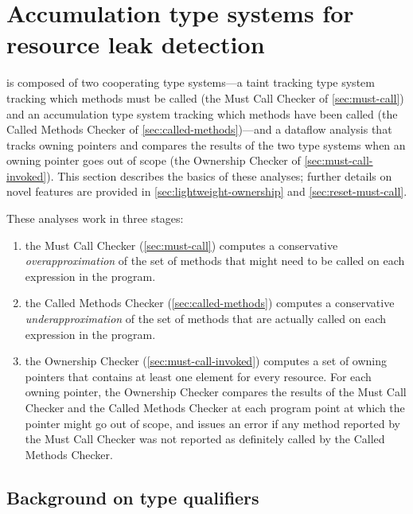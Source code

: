 
\section{Accumulation type systems for resource leak detection}
\label{sec:base-type-systems}

\tool is composed of two cooperating type systems---a taint tracking
type system tracking which methods must be called (the Must Call
Checker of \cref{sec:must-call}) and an accumulation type system
tracking which methods have been called (the Called Methods Checker of
\cref{sec:called-methods})---and a dataflow analysis that tracks
owning pointers and compares the results of the two type systems when
an owning pointer goes out of scope (the Ownership Checker of
\cref{sec:must-call-invoked}). This section describes the basics of
these analyses; further details on novel features are provided in
\cref{sec:lightweight-ownership} and \cref{sec:reset-must-call}.

These analyses work in three stages:
\begin{enumerate}
\item the Must Call Checker (\cref{sec:must-call}) computes a conservative
  \emph{overapproximation} of the set of methods that might need to be called
  on each expression in the program.
\item the Called Methods Checker (\cref{sec:called-methods}) computes
  a conservative \emph{underapproximation} of the set of methods that are
  actually called on each expression in the program.
\item the Ownership Checker (\cref{sec:must-call-invoked}) computes a set
  of owning pointers that contains at least one element for every resource.
  For each owning pointer, the Ownership Checker compares the results
  of the Must Call Checker and the Called Methods Checker at each program
  point at which the pointer might go out of scope, and issues an error
  if any method reported by the Must Call Checker was not reported as
  definitely called by the Called Methods Checker.
\end{enumerate}

\subsection{Background on type qualifiers}
\label{sec:background}

